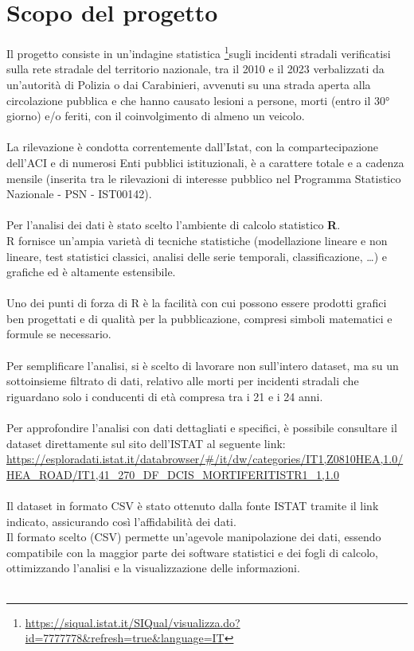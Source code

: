 \documentclass[14pt, openany, titlepage]{report} %
\begin{document}
\section{Scopo del progetto}
Il progetto consiste in un’indagine statistica \footnote{\url{https://siqual.istat.it/SIQual/visualizza.do?id=7777778&refresh=true&language=IT}}sugli incidenti stradali verificatisi sulla rete stradale del territorio nazionale, tra il 2010 e il 2023 verbalizzati da un'autorità di Polizia o dai Carabinieri, 
avvenuti su una strada aperta alla circolazione pubblica e che hanno causato lesioni a persone, morti (entro il 30° giorno) e/o feriti, con il coinvolgimento 
di almeno un veicolo. \\\\
\noindent
La rilevazione è condotta correntemente dall’Istat, con la compartecipazione dell'ACI e di numerosi Enti pubblici istituzionali, 
è a carattere totale e a cadenza mensile (inserita tra le rilevazioni di interesse pubblico nel Programma Statistico Nazionale - PSN - IST00142). \\\\
\noindent
Per l'analisi dei dati è stato scelto l'ambiente di calcolo statistico \textbf{R}. \\
R fornisce un'ampia varietà di tecniche statistiche (modellazione lineare e non lineare, test statistici classici, analisi delle serie temporali, classificazione, \dots)
e grafiche ed è altamente estensibile.\\\\
\noindent
Uno dei punti di forza di R è la facilità con cui possono essere prodotti grafici ben progettati e di qualità per la pubblicazione, 
compresi simboli matematici e formule se necessario.\\\\
\noindent
Per semplificare l'analisi, si è scelto di lavorare non sull'intero dataset, 
ma su un sottoinsieme filtrato di dati, relativo alle morti per incidenti stradali che riguardano solo i conducenti di età compresa tra i 21 e i 24 anni.\\\\
\noindent
Per approfondire l'analisi con dati dettagliati e specifici, è possibile consultare il dataset direttamente sul sito dell'ISTAT al seguente link:
\url{https://esploradati.istat.it/databrowser/#/it/dw/categories/IT1,Z0810HEA,1.0/HEA_ROAD/IT1,41_270_DF_DCIS_MORTIFERITISTR1_1,1.0}\\\\
\noindent
Il dataset in formato CSV è stato ottenuto dalla fonte ISTAT tramite il link indicato, assicurando così l'affidabilità dei dati.\\
Il formato scelto (CSV) permette un'agevole manipolazione dei dati, essendo compatibile con la maggior parte dei software statistici e
dei fogli di calcolo, ottimizzando l'analisi e la visualizzazione delle informazioni.\\\\
\end{document}

